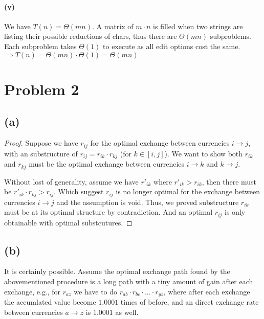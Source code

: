 \documentclass[11pt]{article}
\begin{document}
\paragraph{(v)}
We have $T(n) = \Theta(mn)$. A matrix of $m \cdot n$ is filled when two strings are listing their possible reductions of chars, thus there are $\Theta(mn)$ subproblems. Each subproblem takes $\Theta(1)$ to execute as all edit options cost the same.\\
$\Longrightarrow T(n) =  \Theta(mn) \cdot \Theta(1) =  \Theta(mn)$

\section{Problem 2}

\subsection{(a)}
\begin{proof}
Suppose we have $r_{ij}$ for the optimal exchange between currencies $i \to j$, with an substructure of $r_{ij} = r_{ik} \cdot r_{kj}$ (for $k \in [i,j]$). We want to show both $r_{ik}$ and $r_{kj}$ must be the optimal exchange between currencies $i \to k$ and $k \to j$.

Without lost of generality, assume we have $r'_{ik}$ where $r'_{ik} > r_{ik}$, then there must be $r'_{ik} \cdot r_{kj} > r_{ij}$. Which suggest $r_{ij}$ is no longer optimal for the exchange between currencies $i \to j$ and the assumption is void. Thus, we proved substructure $r_{ik}$ must be at its optimal structure by contradiction. And an optimal $r_{ij}$ is only obtainable with optimal substcutures.
\end{proof}

\subsection{(b)}

It is certainly possible. Assume the optimal exchange path found by the abovementioned procedure is a long path with a tiny amount of gain after each exchange, e.g., for $r_{az}$ we have to do $ r_{ab} \cdot r_{bc} \cdot ... \cdot r_{yz}$, where after each exchange the accumlated value become $1.0001$ times of before, and an direct exchange rate between currencies $a \to z$ is $1.0001$ as well.
\end{document}

